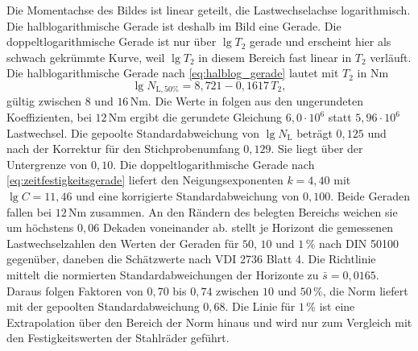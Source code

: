 Die Momentachse des Bildes ist linear geteilt, die Lastwechselachse logarithmisch. Die halblogarithmische Gerade ist deshalb im Bild eine Gerade. Die doppeltlogarithmische Gerade ist nur über $\lg T_{2}$ gerade und erscheint hier als schwach gekrümmte Kurve, weil $\lg T_{2}$ in diesem Bereich fast linear in $T_{2}$ verläuft. Die halblogarithmische Gerade nach \eqref{eq:halblog_gerade} lautet mit $T_{2}$ in Nm
\begin{equation}
	\lg N_{\mathrm{L},50\%} = 8{,}721 - 0{,}1617 \, T_{2} ,
	\label{eq:woehler_pa46_halblog}
\end{equation}
gültig zwischen $8$ und $16$\,Nm. Die Werte in  folgen aus den ungerundeten Koeffizienten, bei $12$\,Nm ergibt die gerundete Gleichung $6{,}0 \cdot 10^{6}$ statt $5{,}96 \cdot 10^{6}$ Lastwechsel. Die gepoolte Standardabweichung von $\lg N_{\mathrm{L}}$ beträgt $0{,}125$ und nach der Korrektur für den Stichprobenumfang $0{,}129$. Sie liegt über der Untergrenze von $0{,}10$. Die doppeltlogarithmische Gerade nach \eqref{eq:zeitfestigkeitsgerade} liefert den Neigungsexponenten $k = 4{,}40$ mit $\lg C = 11{,}46$ und eine korrigierte Standardabweichung von $0{,}100$. Beide Geraden fallen bei $12$\,Nm zusammen. An den Rändern des belegten Bereichs weichen sie um höchstens $0{,}06$ Dekaden voneinander ab.  stellt je Horizont die gemessenen Lastwechselzahlen den Werten der Geraden für $50$, $10$ und $1$\,\% nach DIN 50100 gegenüber, daneben die Schätzwerte nach VDI 2736 Blatt 4. Die Richtlinie mittelt die normierten Standardabweichungen der Horizonte zu $\bar{s} = 0{,}0165$. Daraus folgen Faktoren von $0{,}70$ bis $0{,}74$ zwischen $10$ und $50$\,\%, die Norm liefert mit der gepoolten Standardabweichung $0{,}68$. Die Linie für $1$\,\% ist eine Extrapolation über den Bereich der Norm hinaus und wird nur zum Vergleich mit den Festigkeitswerten der Stahlräder geführt.


